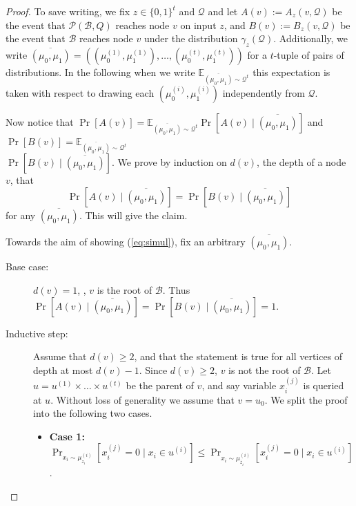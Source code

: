 \documentclass{toc}
\newcommand{\clB}{\mathcal{B}}
\newcommand{\clQ}{\mathcal{Q}}
\newcommand{\clP}{\mathcal{P}}
\newcommand{\E}{\mathbb{E}}
\begin{document}
\begin{proof}	
To save writing, we fix $z \in \{0,1\}^t$ and $\clQ$ and let $A(v) := A_z(v, \clQ)$ be the 
event that $\clP(\clB,Q)$ reaches node $v$ on input $z$, and $B(v):=B_z(v,\clQ)$ be the event that $\clB$ reaches node $v$ under the distribution
$\gamma_z(\clQ)$.  Additionally, we write $\overline{(\mu_0, \mu_1)} = ((\mu_0^{(1)}, \mu_1^{(1)}), \ldots, (\mu_0^{(t)}, \mu_1^{(t)}))$ for a $t$-tuple of 
pairs of distributions.  In the following when we write $\E_{\overline{(\mu_0, \mu_1)} \sim \clQ^t}$ this expectation is taken with respect to drawing each 
$(\mu_0^{(i)}, \mu_1^{(i)})$ independently from $\clQ$.

Now notice that $\Pr[A(v)] = \E_{\overline{(\mu_0, \mu_1)}\sim \clQ^t} \Pr[A(v) \mid \overline{(\mu_0, \mu_1)}]$ and 
$\Pr[B(v)] = \E_{\overline{(\mu_0, \mu_1)} \sim \clQ^t}$ \\ $\Pr[B(v) \mid \overline{(\mu_0, \mu_1)}]$.  We prove by induction on $d(v)$, the depth of a node $v$, that
\begin{equation}
\label{eq:simul}
\Pr[A(v) \mid \overline{(\mu_0, \mu_1)}]=\Pr[B(v) \mid \overline{(\mu_0, \mu_1)}]
\end{equation}
for any $\overline{(\mu_0, \mu_1)}$.  This will give the claim. 

Towards the aim of showing (\ref{eq:simul}), fix an arbitrary $\overline{(\mu_0, \mu_1)}$.

\begin{description}

\item[Base case:] $d(v)=1$, \ie, $v$ is the root of $\clB$. Thus $\Pr[A(v) \mid \overline{(\mu_0, \mu_1)}]=\Pr[B(v) \mid \overline{(\mu_0, \mu_1)}]=1$.

\item[Inductive step:] Assume that $d(v) \geq 2$, and that the statement is true for all vertices of depth at most $d(v)-1$. Since $d(v) \geq 2$, $v$ is not the root of $\clB$. Let $u=u^{(1)} \times \ldots \times u^{(t)}$ be the parent of 
$v$, and say variable $x_i^{(j)}$ is queried at $u$. Without loss of generality we assume that $v=u_0$. We split the proof into the following two cases.
\begin{itemize}
\item {\bf Case 1:} $\Pr_{x_i \sim \mu_{z_i}^{(i)}}[x_i^{(j)}=0 \mid x_i \in u^{(i)}] \leq \Pr_{x_i \sim \mu_{\overline{z}_i}^{(i)}}[x_i^{(j)}=0 \mid x_i \in u^{(i)}]$.


\end{itemize}
\end{description}
\end{proof}
\end{document}
